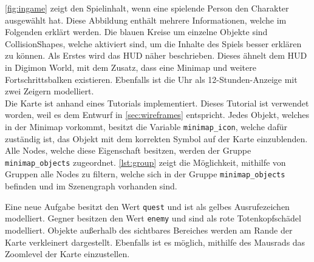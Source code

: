 \autoref{fig:ingame} zeigt den Spielinhalt, wenn eine spielende Person den Charakter ausgewählt hat. Diese Abbildung enthält mehrere Informationen, welche im Folgenden erklärt werden. Die blauen Kreise um einzelne Objekte sind CollisionShapes, welche aktiviert sind, um die Inhalte des Spiels besser erklären zu können. Als Erstes wird das \ac{HUD} näher beschrieben. Dieses ähnelt dem \ac{HUD} in Digimon World, mit dem Zusatz, dass eine Minimap und weitere Fortschrittsbalken existieren. Ebenfalls ist die Uhr als 12-Stunden-Anzeige mit zwei Zeigern modelliert.\\

Die Karte ist anhand eines Tutorials implementiert\cite{kids-minimap}. Dieses Tutorial ist verwendet worden, weil es dem Entwurf in \autoref{sec:wireframes} entspricht. Jedes Objekt, welches in der Minimap vorkommt, besitzt die Variable \texttt{minimap\_icon}, welche dafür zuständig ist, das Objekt mit dem korrekten Symbol auf der Karte einzublenden. Alle Nodes, welche diese Eigenschaft besitzen, werden der Gruppe \texttt{minimap\_objects} zugeordnet. \autoref{lst:group} zeigt die Möglichkeit, mithilfe von Gruppen alle Nodes zu filtern, welche sich in der Gruppe \texttt{minimap\_objects} befinden und im Szenengraph vorhanden sind.\\


Eine neue Aufgabe besitzt den Wert \texttt{quest} und ist als gelbes Ausrufezeichen modelliert. Gegner besitzen den Wert \texttt{enemy} und sind als rote Totenkopfschädel modelliert. Objekte außerhalb des sichtbares Bereiches werden am Rande der Karte verkleinert dargestellt. Ebenfalls ist es möglich, mithilfe des Mausrads das Zoomlevel der Karte einzustellen. \\

